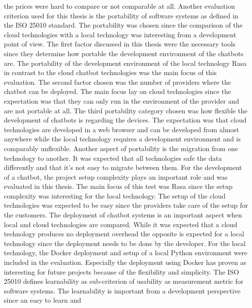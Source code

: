 the prices were hard to compare or not comparable at all.
Another evaluation criterion used for this thesis is the portability of 
software systems as defined in the ISO 25010\cite{iso25010} standard.
The portability was chosen since the comparison of the cloud 
technologies with a local technology was interesting from a 
development point of view.
The first factor discussed in this thesis were the necessary tools 
since they determine how portable the development environment of the 
chatbots are.
The portability of the development environment of the local technology 
Rasa in contrast to the cloud chatbot technologies was the 
main focus of this evaluation.
The second factor chosen was the number of providers where the 
chatbot can be deployed.
The main focus lay on cloud technologies since the expectation was
that they can only run in the environment of the provider and are 
not portable at all.
The third portability category chosen was how flexible the development
of chatbots is regarding the devices.
The expectation was that cloud technologies are developed in a 
web browser and can be developed from almost anywhere while 
the local technology requires a development environment and is 
comparably unflexible.
Another aspect of portability is the migration from one technology to another.
It was expected that all technologies safe the data differently and that it's not 
easy to migrate between them.
For the development of a chatbot, the project setup complexity plays an important 
role and was evaluated in this thesis.
The main focus of this test was Rasa since the setup complexity was interesting 
for the local technology.
The setup of the cloud technologies was expected to be easy since the providers 
take care of the setup for the customers.
The deployment of chatbot systems is an important aspect when local and cloud 
technologies are compared.
While it was expected that a cloud technology produces no deployment overhead 
the opposite is expected for a local technology since the deployment needs to 
be done by the developer.
For the local technology, the Docker deployment and setup of a local Python environment were 
included in the evaluation.
Especially the deployment using Docker has proven as interesting for 
future projects because of the flexibility and simplicity. 
The ISO 25010\cite{iso25010} defines learnability as sub-criterion of usability as measurement
metric for software systems.
The learnability is important from a development perspective since an easy to learn and 
